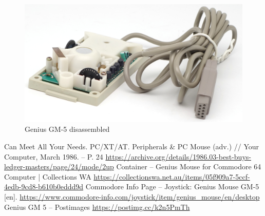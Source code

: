 \documentclass[11pt, a4paper]{article}
\begin{document}
 \begin{figure}[h]
    \centering
    \includegraphics[scale=0.65]{1987_genius_gm5_mouse/inside_30.jpg}
    \caption{Genius GM-5 disassembled}
    \label{fig:GM5MouseInside}
\end{figure}

\begin{thebibliography}{9}
 Can Meet All Your Needs. PC/XT/AT. Peripherals \& PC Mouse (adv.) // Your Computer, March 1986. -- P. 24 \url{https://archive.org/details/1986.03-best-buys-ledger-masters/page/24/mode/2up}
 Container -- Genius Mouse for Commodore 64 Computer | Collections WA \url{https://collectionswa.net.au/items/05f909a7-5ccf-4edb-9cd8-b610b0eddd9d}
 Commodore Info Page -- Joystick: Genius Mouse GM-5 [en]. \url{https://www.commodore-info.com/joystick/item/genius_mouse/en/desktop}
 Genius GM 5 -- Postimages \url{https://postimg.cc/k2n5PmTh}
\end{thebibliography}
\end{document}
